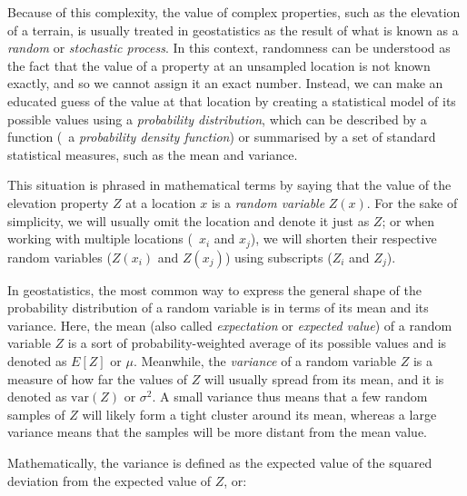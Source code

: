 Because of this complexity, the value of complex properties, such as the elevation of a terrain, is usually treated in geostatistics as the result of what is known as a \emph{random} or \emph{stochastic process}.
In this context, randomness can be understood as the fact that the value of a property at an unsampled location is not known exactly, and so we cannot assign it an exact number.
Instead, we can make an educated guess of the value at that location by creating a statistical model of its possible values using a \emph{probability distribution}, which can be described by a function (\ie\ a \emph{probability density function}) or summarised by a set of standard statistical measures, such as the mean and variance.

This situation is phrased in mathematical terms by saying that the value of the elevation property \(Z\) at a location \(x\) is a \emph{random variable} \(Z(x)\).
For the sake of simplicity, we will usually omit the location and denote it just as \(Z\); or when working with multiple locations (\eg\ \(x_i\) and \(x_j\)), we will shorten their respective random variables (\(Z(x_i)\) and \(Z(x_j)\)) using subscripts (\(Z_i\) and \(Z_j\)).

In geostatistics, the most common way to express the general shape of the probability distribution of a random variable is in terms of its mean and its variance.
Here, the mean (also called \emph{expectation} or \emph{expected value}) of a random variable \(Z\) is a sort of probability-weighted average of its possible values and is denoted as \(E[Z]\) or \(\mu\).
Meanwhile, the \emph{variance} of a random variable \(Z\) is a measure of how far the values of \(Z\) will usually spread from its mean, and it is denoted as \(\mathrm{var}(Z)\) or \(\sigma^2\).
A small variance thus means that a few random samples of \(Z\) will likely form a tight cluster around its mean, whereas a large variance means that the samples will be more distant from the mean value.

Mathematically, the variance is defined as the expected value of the squared deviation from the expected value of \(Z\), or:

